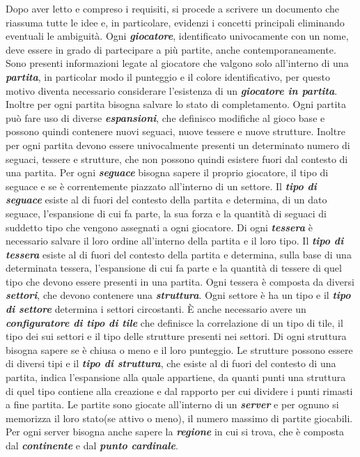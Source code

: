 Dopo aver letto e compreso i requisiti, si procede a scrivere un documento che riassuma tutte le idee e, in particolare, evidenzi i concetti principali eliminando eventuali le ambiguità.
Ogni \textbf{\emph{giocatore}}, identificato univocamente con un nome, deve essere in grado di partecipare a più partite, anche contemporaneamente. Sono presenti informazioni legate al giocatore che valgono solo all'interno di una \textbf{\emph{partita}}, in particolar modo il punteggio e il colore identificativo, per questo motivo diventa necessario considerare l'esistenza di un \textbf{\emph{giocatore in partita}}. Inoltre per ogni partita bisogna salvare lo stato di completamento. Ogni partita può fare uso di diverse \textbf{\emph{espansioni}}, che definisco modifiche al gioco base e possono quindi contenere nuovi seguaci, nuove tessere e nuove strutture. Inoltre per ogni partita devono essere univocalmente presenti un determinato numero di seguaci, tessere e strutture, che non possono quindi esistere fuori dal contesto di una partita. Per ogni \textbf{\emph{seguace}} bisogna sapere il proprio giocatore, il tipo di seguace e se è correntemente piazzato all'interno di un settore. Il \textbf{\emph{tipo di seguace}} esiste al di fuori del contesto della partita e determina, di un dato seguace, l'espansione di cui fa parte, la sua forza e la quantità di seguaci di suddetto tipo che vengono assegnati a ogni giocatore. Di ogni \textbf{\emph{tessera}} è necessario salvare il loro ordine all'interno della partita e il loro tipo. Il \textbf{\emph{tipo di tessera}} esiste al di fuori del contesto della partita e determina, sulla base di una determinata tessera, l'espansione di cui fa parte e la quantità di tessere di quel tipo che devono essere presenti in una partita. Ogni tessera è composta da diversi \textbf{\emph{settori}}, che devono contenere una \textbf{\emph{struttura}}. Ogni settore è ha un tipo e il \textbf{\emph{tipo di settore}} determina i settori circostanti. È anche necessario avere un \textbf{\emph{configuratore di tipo di tile}} che definisce la correlazione di un tipo di tile, il tipo dei sui settori e il tipo delle strutture presenti nei settori. Di ogni struttura bisogna sapere se è chiusa o meno e il loro punteggio. Le strutture possono essere di diversi tipi e il \textbf{\emph{tipo di struttura}}, che esiste al di fuori del contesto di una partita, indica l'espansione alla quale appartiene, da quanti punti una struttura di quel tipo contiene alla creazione e dal rapporto per cui dividere i punti rimasti a fine partita. Le partite sono giocate all'interno di un \textbf{\emph{server}} e per ognuno si memorizza il loro stato(se attivo o meno), il numero massimo di partite giocabili. Per ogni server bisogna anche sapere la \textbf{\emph{regione}} in cui si trova, che è composta dal \textbf{\emph{continente}} e dal \textbf{\emph{punto cardinale}}.
\medskip

